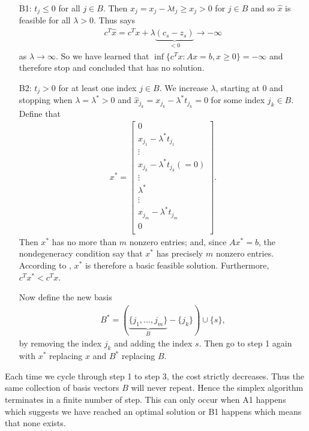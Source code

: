 \begin{enumerate}
    \item[B1:] $t_j \le 0$ for all $j \in B$.
    Then $\hat{x}_j = x_j - \lambda t_j \ge x_j > 0$ for $j \in B$ and so $\hat{x}$ is feasible for all $\lambda > 0$.
    Thus  says
    \begin{align}
        c^T \hat{x} = c^T x + \lambda \underbrace{(c_s - z_s)}_{< 0} \to - \infty
    \end{align} as $\lambda \to \infty$.
    So we have learned that $\inf \{c^T x : Ax = b, x \ge 0 \} = -\infty$ and therefore stop and concluded that  has no solution.
    \item[B2:] $t_j > 0$ for at least one index $j \in B$.
    We increase $\lambda$, starting at $0$ and stopping when $\lambda = \lambda^* > 0$ and $\hat{x}_{j_k} = x_{j_k} - \lambda^* t_{j_k} = 0$ for some index $j_k \in B$. 
    Define that 
    \begin{align}
        x^* = \begin{bmatrix}
            0 \\
            x_{j_1} - \lambda^* t_{j_1} \\
            \vdots \\
            x_{j_k} - \lambda^* t_{j_k} (= 0) \\
            \vdots \\
            \lambda^* \\
            \vdots \\
            x_{j_m} - \lambda^* t_{j_m} \\
            0 \\
        \end{bmatrix}.
    \end{align}
    Then $x^*$ has no more than $m$ nonzero entries; and, since $Ax^*=b$, the nondegeneracy condition say that $x^*$ has precisely $m$ nonzero entries.
    According to , $x^*$ is therefore a basic feasible solution.
    Furthermore, $c^T x^* < c^T x$.
    
    Now define the new basis 
    \begin{align}
    B^* = (\underbrace{\{ j_1, \dots, j_m \}}_{B} - \{ j_k \}) \cup \{ s \},
    \end{align}
    by removing the index $j_k$ and adding the index $s$. 
    Then go to step 1 again with $x^*$ replacing $x$ and $B^*$ replacing $B$.
\end{enumerate}

Each time we cycle through step 1 to step 3, the cost strictly decreases.
Thus the same collection of basis vectors $B$ will never repeat.
Hence the simplex algorithm terminates in a finite number of step.
This can only occur when A1 happens which suggests we have reached an optimal solution or B1 happens which means that none exists.

